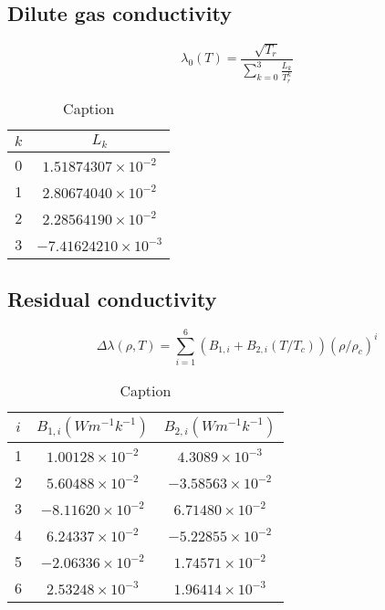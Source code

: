 \subsection{Dilute gas conductivity}
\begin{equation}
    \lambda_0(T) = \frac{\sqrt{T_r}}{\sum^3_{k=0}\frac{L_k}{T_r^k}}
\end{equation}

\begin{table}[h]
    \centering
    \begin{tabular}{c|c}
         $k$ & $L_k$  \\
         \hline
         0  &   $1.51874307\times10^{-2}$\\
         1  &   $2.80674040\times10^{-2}$\\
         2  &   $2.28564190\times10^{-2}$\\
         3  &   $-7.41624210\times10^{-3}$\\
    \end{tabular}
    \caption{Caption}
    \label{tab:my_label}
\end{table}

\subsection{Residual conductivity}
\begin{equation}
    \Delta\lambda(\rho,T) = \sum_{i=1}^6(B_{1,i} + B_{2,i}(T/T_c))(\rho/\rho_c)^i
\end{equation}

\begin{table}[h]
    \centering
    \begin{tabular}{c|c|c}
         $i$ & $B_{1,i}(Wm^{-1}k^{-1})$  & $B_{2,i}(Wm^{-1}k^{-1})$\\ 
         \hline
         1  &   $1.00128\times10^{-2}$   & $4.3089\times10^{-3}$\\
         2  &   $5.60488\times10^{-2}$   & $-3.58563\times10^{-2}$\\
         3  &   $-8.11620\times10^{-2}$  & $6.71480\times10^{-2}$\\
         4  &   $6.24337\times10^{-2}$   & $-5.22855\times10^{-2}$\\
         5  &   $-2.06336\times10^{-2}$  & $1.74571\times10^{-2}$\\
         6  &   $2.53248\times10^{-3}$   & $1.96414\times10^{-3}$\\       
    \end{tabular}
    \caption{Caption}
    \label{tab:my_label}
\end{table}


